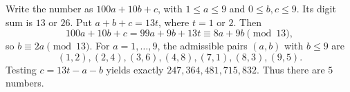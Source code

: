 Write the number as $100a+10b+c$, with $1\le a\le9$ and $0\le b,c\le9$. Its digit sum is $13$ or $26$. Put $a+b+c=13t$, where $t=1$ or $2$. Then
\[
100a+10b+c=99a+9b+13t\equiv8a+9b\pmod{13},
\]
so $b\equiv2a\pmod{13}$. For $a=1,\ldots,9$, the admissible pairs $(a,b)$ with $b\le9$ are
\[
(1,2),(2,4),(3,6),(4,8),(7,1),(8,3),(9,5).
\]
Testing $c=13t-a-b$ yields exactly $247,364,481,715,832$. Thus there are $\boxed5$ numbers.
